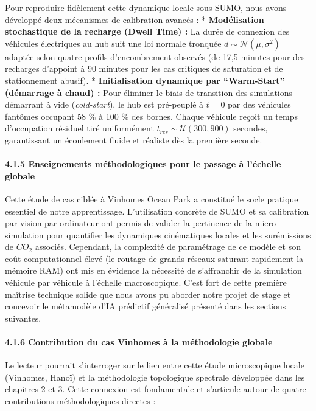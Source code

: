 \documentclass[10pt, a4paper]{article}
\begin{document}
Pour reproduire fidèlement cette dynamique locale sous SUMO, nous avons
développé deux mécanismes de calibration avancés : *
\textbf{Modélisation stochastique de la recharge (Dwell Time) :} La
durée de connexion des véhicules électriques au hub suit une loi normale
tronquée \(d \sim \mathcal{N}(\mu, \sigma^2)\) adaptée selon quatre
profils d'encombrement observés (de 17,5 minutes pour des recharges
d'appoint à 90 minutes pour les cas critiques de saturation et de
stationnement abusif). * \textbf{Initialisation dynamique par
``Warm-Start'' (démarrage à chaud) :} Pour éliminer le biais de
transition des simulations démarrant à vide (\emph{cold-start}), le hub
est pré-peuplé à \(t=0\) par des véhicules fantômes occupant 58 \% à 100
\% des bornes. Chaque véhicule reçoit un temps d'occupation résiduel
tiré uniformément \(t_{res} \sim \mathcal{U}(300, 900)\) secondes,
garantissant un écoulement fluide et réaliste dès la première seconde.

\paragraph{4.1.5 Enseignements méthodologiques pour le passage à
l'échelle
globale}\label{enseignements-muxe9thodologiques-pour-le-passage-uxe0-luxe9chelle-globale}

Cette étude de cas ciblée à Vinhomes Ocean Park a constitué le socle
pratique essentiel de notre apprentissage. L'utilisation concrète de
SUMO et sa calibration par vision par ordinateur ont permis de valider
la pertinence de la micro-simulation pour quantifier les dynamiques
cinématiques locales et les surémissions de \(CO_2\) associés.
Cependant, la complexité de paramétrage de ce modèle et son coût
computationnel élevé (le routage de grands réseaux saturant rapidement
la mémoire RAM) ont mis en évidence la nécessité de s'affranchir de la
simulation véhicule par véhicule à l'échelle macroscopique. C'est fort
de cette première maîtrise technique solide que nous avons pu aborder
notre projet de stage et concevoir le métamodèle d'IA prédictif
généralisé présenté dans les sections suivantes.

\paragraph{4.1.6 Contribution du cas Vinhomes à la méthodologie
globale}\label{contribution-du-cas-vinhomes-uxe0-la-muxe9thodologie-globale}

Le lecteur pourrait s'interroger sur le lien entre cette étude
microscopique locale (Vinhomes, Hanoï) et la méthodologie topologique
spectrale développée dans les chapitres 2 et 3. Cette connexion est
fondamentale et s'articule autour de quatre contributions
méthodologiques directes :
\end{document}
